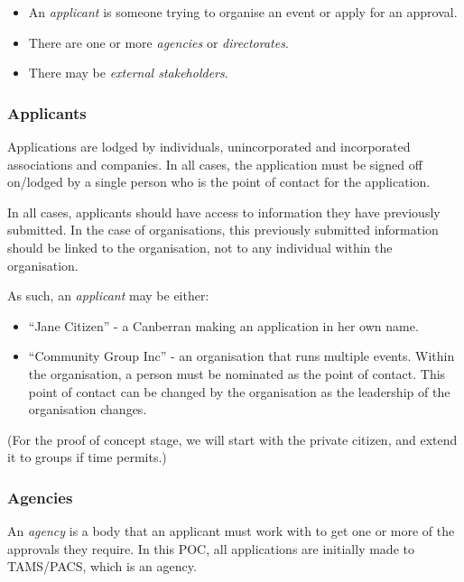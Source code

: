 \documentclass[12pt,a4paper,twosided]{article}
\begin{document}
\begin{itemize}
\itemsep1pt\parskip0pt
\item
  An \emph{applicant} is someone trying to organise an event or apply
  for an approval.
\item
  There are one or more \emph{agencies} or \emph{directorates}.
\item
  There may be \emph{external stakeholders}.
\end{itemize}

\subsubsection{Applicants}\label{applicants}

Applications are lodged by individuals, unincorporated and incorporated
associations and companies. In all cases, the application must be signed
off on/lodged by a single person who is the point of contact for the
application.

In all cases, applicants should have access to information they have
previously submitted. In the case of organisations, this previously
submitted information should be linked to the organisation, not to any
individual within the organisation.

As such, an \emph{applicant} may be either:

\begin{itemize}
\itemsep1pt\parskip0pt
\item
  ``Jane Citizen'' - a Canberran making an application in her own name.
\item
  ``Community Group Inc'' - an organisation that runs multiple events.
  Within the organisation, a person must be nominated as the point of
  contact. This point of contact can be changed by the organisation as
  the leadership of the organisation changes.
\end{itemize}

(For the proof of concept stage, we will start with the private citizen,
and extend it to groups if time permits.)

\subsubsection{Agencies}\label{agencies}

An \emph{agency} is a body that an applicant must work with to get one
or more of the approvals they require. In this POC, all applications are
initially made to TAMS/PACS, which is an agency.
\end{document}
